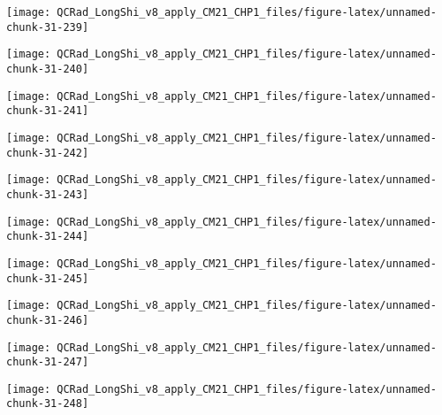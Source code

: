 \documentclass[
  10pt,
  a4paper,oneside]{article}
\begin{document}
\begin{center}\texttt{[image: QCRad\_LongShi\_v8\_apply\_CM21\_CHP1\_files/figure-latex/unnamed-chunk-31-239]} \end{center}

\begin{center}\texttt{[image: QCRad\_LongShi\_v8\_apply\_CM21\_CHP1\_files/figure-latex/unnamed-chunk-31-240]} \end{center}

\begin{center}\texttt{[image: QCRad\_LongShi\_v8\_apply\_CM21\_CHP1\_files/figure-latex/unnamed-chunk-31-241]} \end{center}

\begin{center}\texttt{[image: QCRad\_LongShi\_v8\_apply\_CM21\_CHP1\_files/figure-latex/unnamed-chunk-31-242]} \end{center}

\begin{center}\texttt{[image: QCRad\_LongShi\_v8\_apply\_CM21\_CHP1\_files/figure-latex/unnamed-chunk-31-243]} \end{center}

\begin{center}\texttt{[image: QCRad\_LongShi\_v8\_apply\_CM21\_CHP1\_files/figure-latex/unnamed-chunk-31-244]} \end{center}

\begin{center}\texttt{[image: QCRad\_LongShi\_v8\_apply\_CM21\_CHP1\_files/figure-latex/unnamed-chunk-31-245]} \end{center}

\begin{center}\texttt{[image: QCRad\_LongShi\_v8\_apply\_CM21\_CHP1\_files/figure-latex/unnamed-chunk-31-246]} \end{center}

\begin{center}\texttt{[image: QCRad\_LongShi\_v8\_apply\_CM21\_CHP1\_files/figure-latex/unnamed-chunk-31-247]} \end{center}

\begin{center}\texttt{[image: QCRad\_LongShi\_v8\_apply\_CM21\_CHP1\_files/figure-latex/unnamed-chunk-31-248]} \end{center}
\end{document}
